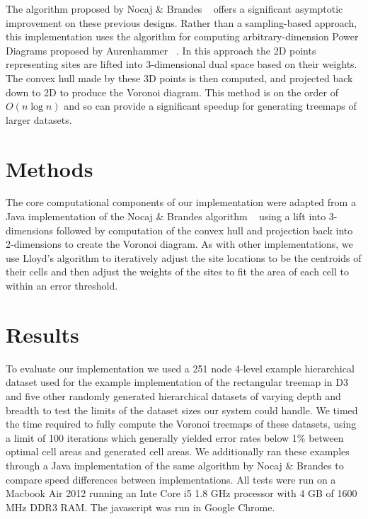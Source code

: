 \documentclass{acm_proc_article-sp}
\begin{document}
The algorithm proposed by Nocaj \& Brandes ~\cite{nocaj:faster} offers
a significant asymptotic improvement on these previous designs. Rather
than a sampling-based approach, this implementation uses the algorithm
for computing arbitrary-dimension Power Diagrams proposed by
Aurenhammer ~\cite{aurenhammer:power}. In this approach the 2D points
representing sites are lifted into 3-dimensional dual space based on
their weights. The convex hull made by these 3D points is then
computed, and projected back down to 2D to produce the Voronoi
diagram. This method is on the order of $O(n \log n)$ and so can
provide a significant speedup for generating treemaps of larger
datasets.

\section{Methods}
The core computational components of our implementation were adapted
from a Java implementation of the Nocaj \& Brandes algorithm
~\cite{nocaj:faster} using a lift into 3-dimensions followed by
computation of the convex hull and projection back into 2-dimensions
to create the Voronoi diagram. As with other implementations, we use
Lloyd's algorithm to iteratively adjust the site locations to be the
centroids of their cells and then adjust the weights of the sites to
fit the area of each cell to within an error threshold.

\section{Results}
To evaluate our implementation we used a 251 node 4-level example
hierarchical dataset used for the example implementation of the
rectangular treemap in D3 and five other randomly generated
hierarchical datasets of varying depth and breadth to test the limits
of the dataset sizes our system could handle. We timed the time
required to fully compute the Voronoi treemaps of these datasets,
using a limit of 100 iterations which generally yielded error rates
below 1\% between optimal cell areas and generated cell areas. We
additionally ran these examples through a Java implementation of the
same algorithm by Nocaj \& Brandes to compare speed differences
between implementations. All tests were run on a Macbook Air 2012
running an Inte Core i5 1.8 GHz processor with 4 GB of 1600 MHz DDR3
RAM. The javascript was run in Google Chrome.
\end{document}
